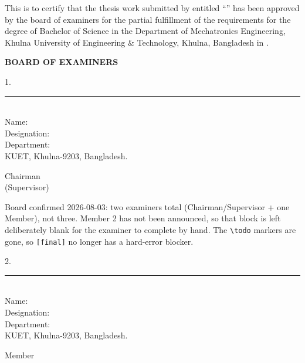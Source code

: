 
\vspace{3\baselineskip}

This is to certify that the thesis work submitted by \studentname{} entitled
``\thesistitle'' has been approved by the board of examiners for the partial fulfillment of the
requirements for the degree of Bachelor of Science in the Department of Mechatronics Engineering,
Khulna University of Engineering \& Technology, Khulna, Bangladesh in .

\vspace{\baselineskip}

\begin{center}\bfseries BOARD OF EXAMINERS\end{center}

\newcommand{\examiner}[5]{%
  \par\vspace{1.5\baselineskip}
  \noindent
  \begin{minipage}[t]{0.08\textwidth}\raggedright #1.\end{minipage}%
  \begin{minipage}[t]{0.62\textwidth}
    \rule{0.9\linewidth}{0.4pt}\\
    Name: #2\\
    Designation: #3\\
    Department: #4\\
    KUET, Khulna-9203, Bangladesh.
  \end{minipage}\hfill
  \begin{minipage}[t]{0.26\textwidth}\raggedleft #5\end{minipage}\par}

\examiner{1}{\supervisorname}{\supervisordesignation}{\supervisordepartment}{Chairman\\(Supervisor)}

\begin{draftnote}
Board confirmed 2026-08-03: two examiners total (Chairman/Supervisor + one Member), not
three. Member 2 has not been announced, so that block is left deliberately blank for the
examiner to complete by hand. The \texttt{\textbackslash todo} markers are gone, so
\texttt{[final]} no longer has a hard-error blocker.
\end{draftnote}

\examiner{2}{}{}{}{Member}

\clearpage
